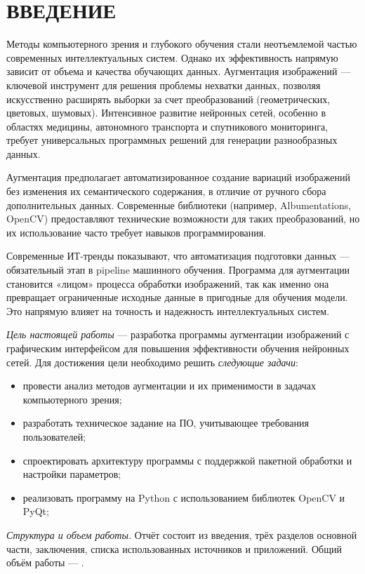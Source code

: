 \section*{ВВЕДЕНИЕ}

Методы компьютерного зрения и глубокого обучения стали неотъемлемой частью современных интеллектуальных систем. Однако их эффективность напрямую зависит от объема и качества обучающих данных. Аугментация изображений — ключевой инструмент для решения проблемы нехватки данных, позволяя искусственно расширять выборки за счет преобразований (геометрических, цветовых, шумовых). Интенсивное развитие нейронных сетей, особенно в областях медицины, автономного транспорта и спутникового мониторинга, требует универсальных программных решений для генерации разнообразных данных.

Аугментация предполагает автоматизированное создание вариаций изображений без изменения их семантического содержания, в отличие от ручного сбора дополнительных данных. Современные библиотеки (например, Albumentations, OpenCV) предоставляют технические возможности для таких преобразований, но их использование часто требует навыков программирования.

Современные ИТ-тренды показывают, что автоматизация подготовки данных — обязательный этап в pipeline машинного обучения. Программа для аугментации становится «лицом» процесса обработки изображений, так как именно она превращает ограниченные исходные данные в пригодные для обучения модели. Это напрямую влияет на точность и надежность интеллектуальных систем.

\emph{Цель настоящей работы} — разработка программы аугментации изображений с графическим интерфейсом для повышения эффективности обучения нейронных сетей. Для достижения цели необходимо решить \emph{следующие задачи}:
\begin{itemize}
	\item провести анализ методов аугментации и их применимости в задачах компьютерного зрения;
	\item разработать техническое задание на ПО, учитывающее требования пользователей;
	\item спроектировать архитектуру программы с поддержкой пакетной обработки и настройки параметров;
	\item реализовать программу на Python с использованием библиотек OpenCV и PyQt;
\end{itemize}

\emph{Структура и объем работы.} Отчёт состоит из введения, трёх разделов основной части, заключения, списка использованных источников и приложений. Общий объём работы — .

